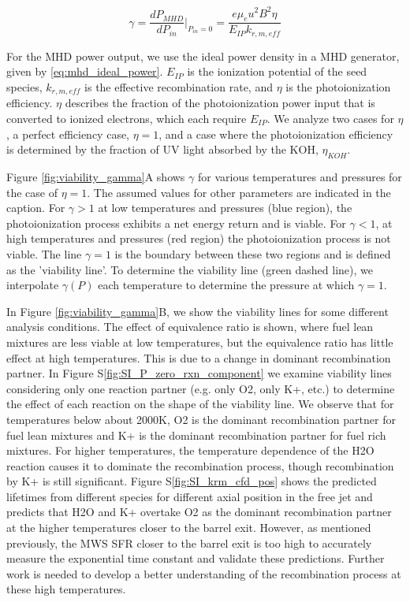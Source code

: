 \begin{equation}
\gamma = \frac{dP_{MHD}}{dP_{in}} \Big|_{P_{in}=0} = \frac{e \mu_e u^2 B^2 \eta}{E_{IP}k_{r, m, eff}} 
\end{equation}


For the MHD power output, we use the ideal power density in a MHD generator, given by \ref{eq:mhd_ideal_power}. $E_{IP}$ is the ionization potential of the seed species, $k_{r, m, eff}$ is the effective recombination rate, and $\eta$ is the photoionization efficiency. $\eta$ describes the fraction of the photoionization power input that is converted to ionized electrons, which each require $E_{IP}$. We analyze two cases for $\eta$, a perfect efficiency case, $\eta=1$, and a case where the photoionization efficiency is determined by the fraction of UV light absorbed by the KOH, $\eta_{KOH}$. 

Figure \ref{fig:viability_gamma}A shows $\gamma$ for various temperatures and pressures for the case of $\eta=1$. The assumed values for other parameters are indicated in the caption.  For $\gamma > 1$ at low temperatures and pressures (blue region), the photoionization process exhibits a net energy return and is viable. For $\gamma < 1$, at high temperatures and pressures (red region) the photoionization process is not viable. The line $\gamma = 1$ is the boundary between these two regions and is defined as the 'viability line'. To determine the viability line (green dashed line), we interpolate $\gamma (P)$ each temperature to determine the pressure at which $\gamma = 1$. 

In Figure \ref{fig:viability_gamma}B, we show the viability lines for some different analysis conditions. The effect of equivalence ratio is shown, where fuel lean mixtures are less viable at low temperatures, but the equivalence ratio has little effect at high temperatures. This is due to a change in dominant recombination partner. In Figure S\ref{fig:SI_P_zero_rxn_component} we examine viability lines considering only one reaction partner (e.g. only O2, only K+, etc.) to determine the effect of each reaction on the shape of the viability line. We observe that for temperatures below about 2000K, O2 is the dominant recombination partner for fuel lean mixtures and K+ is the dominant recombination partner for fuel rich mixtures. For higher temperatures, the temperature dependence of the H2O reaction causes it to dominate the recombination process, though recombination by K+ is still significant. Figure S\ref{fig:SI_krm_cfd_pos} shows the predicted lifetimes from different species for different axial position in the free jet and predicts that H2O and K+ overtake O2 as the dominant recombination partner at the higher temperatures closer to the barrel exit. However, as mentioned previously, the MWS SFR closer to the barrel exit is too high to accurately measure the exponential time constant and validate these predictions. Further work is needed to develop a better understanding of the recombination process at these high temperatures.  

